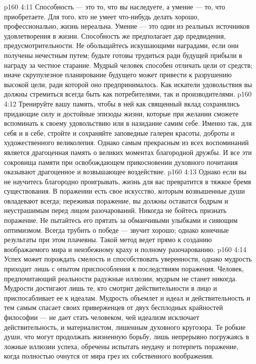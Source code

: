 \vs p160 4:11 Способность --- это то, что вы наследуете, а умение --- то, что приобретаете. Для того, кто не умеет что\hyp{}нибудь делать хорошо, профессионально, жизнь нереальна. Умение --- это один из реальных источников удовлетворения в жизни. Способность же предполагает дар предвидения, предусмотрительности. Не обольщайтесь искушающими наградами, если они получены нечестным путем; будьте готовы трудиться ради будущей прибыли в награду за честное старание. Мудрый человек способен отличать цели от средств; иначе скрупулезное планирование будущего может привести к разрушению высокой цели, ради которой оно предпринималось. Как искатели удовольствия вы должны стремиться всегда быть как потребителями, так и производителями.
\vs p160 4:12 Тренируйте вашу память, чтобы в ней как священный вклад сохранялись придающие силу и достойные эпизоды жизни, которые при желании сможете вспоминать к своему удовольствию или в назидание самим себе. Именно так, для себя и в себе, стройте и сохраняйте заповедные галереи красоты, доброты и художественного великолепия. Однако самым прекрасным из всех воспоминаний является драгоценная память о великих моментах благородной дружбы. И все эти сокровища памяти при освобождающем прикосновении духовного почитания оказывают драгоценное и возвышающее воздействие.
\vs p160 4:13 Однако если вы не научитесь благородно проигрывать, жизнь для вас превратится в тяжкое бремя существования. В поражении есть свое искусство, которым возвышенные души овладевают всегда; переживая поражение, вы должны оставатся бодрым и неустрашимым перед лицом разочарований. Никогда не бойтесь признать поражение. Не пытайтесь его прятать за обманчивыми улыбками и сияющим оптимизмом. Всегда трубить о победе --- звучит хорошо; однако конечные результаты при этом плачевны. Такой метод ведет прямо к созданию воображаемого мира и неизбежному краху и полному разочарованию.
\vs p160 4:14 Успех может порождать смелость и способствовать уверенности, однако мудрость приходит лишь с опытом приспособления к последствиям поражения. Человек, предпочитающий реальности радужные иллюзии, мудрым не станет никогда. Мудрости достигают лишь те, кто смотрит действительности в лицо и приспосабливает ее к идеалам. Мудрость объемлет и идеал и действительность и тем самым спасает своих приверженцев от двух бесплодных крайностей философии --- не дает стать человеком, чей идеализм исключает действительность, и материалистом, лишенным духовного кругозора. Те робкие души, что могут продолжать жизненную борьбу, лишь непрерывно погружаясь в ложные иллюзии успеха, обречены испытать неудачу и потерпеть поражение, когда полностью очнутся от мира грез их собственного воображения.
